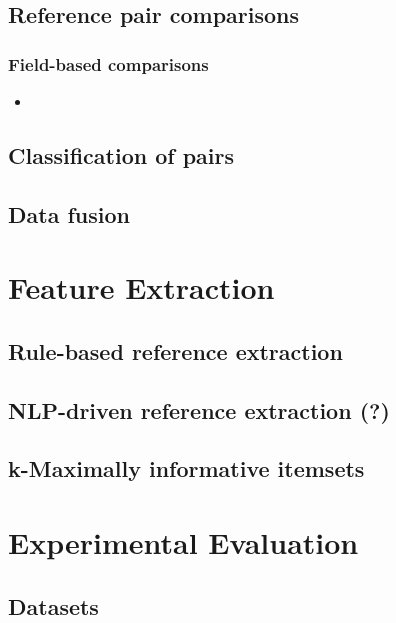 \documentclass[paper=a4, fontsize=11pt]{scrartcl}					%
\numberwithin{equation}{section}					%
\numberwithin{figure}{section}						%
\numberwithin{table}{section}						%
\begin{document}
\subsection{Reference pair comparisons}

\subsubsection{Field-based comparisons}
\begin{itemize}
    \item 
\end{itemize}

\subsection{Classification of pairs}

\subsection{Data fusion}




\section{Feature Extraction}

\subsection{Rule-based reference extraction}

\subsection{NLP-driven reference extraction (?)}

\subsection{k-Maximally informative itemsets}




\section{Experimental Evaluation}

\subsection{Datasets}
\end{document}
